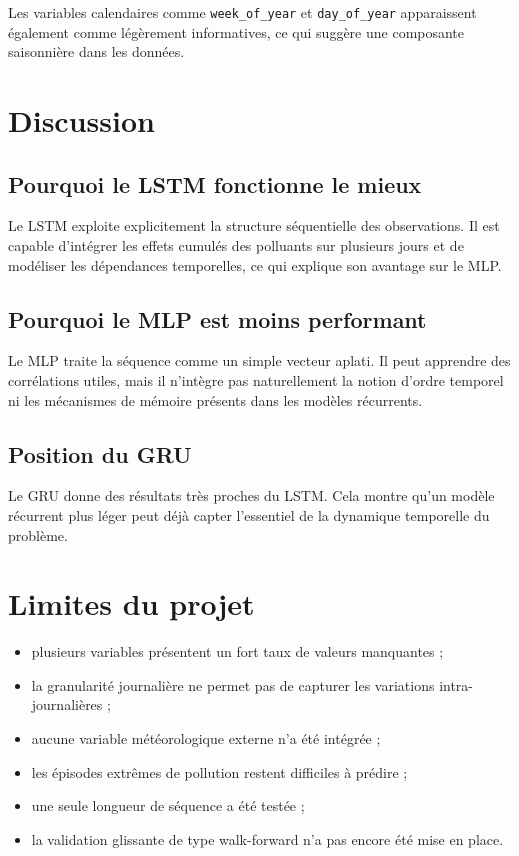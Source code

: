 \documentclass[11pt,a4paper]{article}
\begin{document}
Les variables calendaires comme \texttt{week\_of\_year} et \texttt{day\_of\_year} apparaissent également comme légèrement informatives,
ce qui suggère une composante saisonnière dans les données.

\section{Discussion}

\subsection{Pourquoi le LSTM fonctionne le mieux}
Le LSTM exploite explicitement la structure séquentielle des observations. Il est capable d'intégrer les effets cumulés des polluants
sur plusieurs jours et de modéliser les dépendances temporelles, ce qui explique son avantage sur le MLP.

\subsection{Pourquoi le MLP est moins performant}
Le MLP traite la séquence comme un simple vecteur aplati. Il peut apprendre des corrélations utiles, mais il n'intègre pas naturellement
la notion d'ordre temporel ni les mécanismes de mémoire présents dans les modèles récurrents.

\subsection{Position du GRU}
Le GRU donne des résultats très proches du LSTM. Cela montre qu'un modèle récurrent plus léger peut déjà capter l'essentiel
de la dynamique temporelle du problème.

\section{Limites du projet}

\begin{itemize}
    \item plusieurs variables présentent un fort taux de valeurs manquantes ;
    \item la granularité journalière ne permet pas de capturer les variations intra-journalières ;
    \item aucune variable météorologique externe n'a été intégrée ;
    \item les épisodes extrêmes de pollution restent difficiles à prédire ;
    \item une seule longueur de séquence a été testée ;
    \item la validation glissante de type walk-forward n'a pas encore été mise en place.
\end{itemize}
\end{document}

